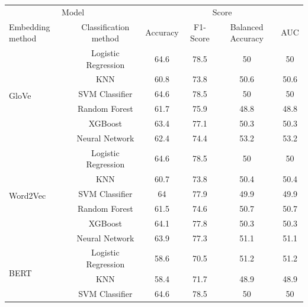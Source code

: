 \begin{table}[htb]
\centering
\begin{tabular}{l|c|c|c|c|c}
\hline


\multicolumn{2}{c|}{Model} & \multicolumn{4}{c}{Score} \\
\cline{1-6}
Embedding method & Classification method & Accuracy & F1-Score & Balanced Accuracy & AUC \\

\hline
\multirow{6}{*}{GloVe}
    & Logistic Regression & 64.6 & 78.5 & 50   &      50   \\
    & KNN &       60.8 &       73.8 &                50.6 &      50.6 \\
    & SVM Classifier &       64.6 &       78.5 &                50   &      50   \\
    & Random Forest &       61.7 &       75.9 &                48.8 &      48.8 \\
    & XGBoost &       63.4 &       77.1 &                50.3 &      50.3 \\
    & Neural Network &       62.4 &       74.4 &                53.2 &      53.2 \\
\hline
\multirow{6}{*}{Word2Vec}
    & Logistic Regression &       64.6 &       78.5 &                50   &      50   \\
    & KNN &       60.7 &       73.8 &                50.4 &      50.4 \\
    & SVM Classifier &       64   &       77.9 &                49.9 &      49.9 \\
    & Random Forest &       61.5 &       74.6 &                50.7 &      50.7 \\
    & XGBoost &       64.1 &       77.8 &                50.3 &      50.3 \\
    & Neural Network &       63.9 &       77.3 &                51.1 &      51.1 \\
\hline
\multirow{6}{*}{BERT} 
    & Logistic Regression &       58.6 &       70.5 &                51.2 &      51.2 \\
    & KNN &       58.4 &       71.7 &                48.9 &      48.9 \\
    & SVM Classifier &       64.6 &       78.5 &                50   &      50   \\

\end{tabular}
\end{table}
